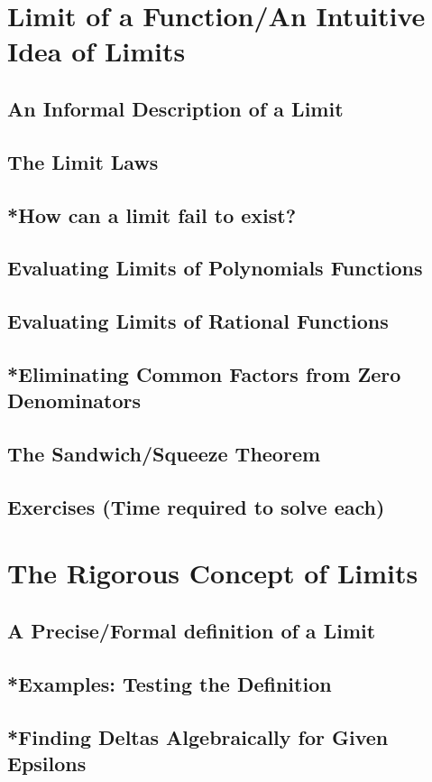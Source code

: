 \documentclass[11pt,letterpaper,twoside]{book}
\begin{document}
\newpage
\section{Limit of a Function/An Intuitive Idea of Limits}
\subsection{An Informal Description of a Limit}
\subsection{The Limit Laws}
\subsection{*How can a limit fail to exist?}
\subsection{Evaluating Limits of Polynomials Functions}
\subsection{Evaluating Limits of Rational Functions}
\subsection{*Eliminating Common Factors from Zero Denominators}
\subsection{The Sandwich/Squeeze Theorem}
\subsection{Exercises (Time required to solve each)}

\newpage
\section{The Rigorous Concept of Limits}
\subsection{A Precise/Formal definition of a Limit}
\subsection{*Examples: Testing the Definition}
\subsection{*Finding Deltas Algebraically for Given Epsilons}
\end{document}
